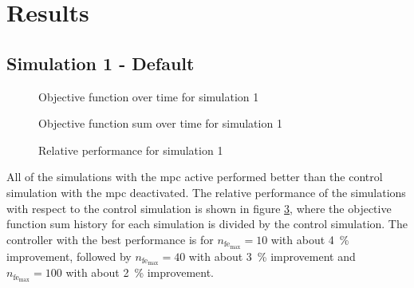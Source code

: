 \documentclass[conference]{IEEEtran}
\begin{document}
\section{Results} \label{sec:results} 

\subsection{Simulation 1 - Default}  \label{subsec:results_SS01}

\begin{figure}[h]
    \centering
    
    \caption{Objective function over time for simulation 1}
    \label{fig:SS01_obj_hist}
\end{figure}

%     

\begin{figure}[h]
    \centering
    
    \caption{Objective function sum over time for simulation 1}
    \label{fig:SS01_s_obj_hist}
\end{figure}

\begin{figure}[h]
    \centering
    
    \caption{Relative performance for simulation 1}
    \label{fig:SS01_s_obj_rel}
\end{figure}


All of the simulations with the \gls{mpc} active performed better than the control simulation with the \gls{mpc} deactivated.
The relative performance of the simulations with respect to the control simulation is shown in figure \ref{fig:SS01_s_obj_rel}, where the objective function sum history for each simulation is divided by the control simulation.
The controller with the best performance is for $n_{\text{fe}_{\text{max}}} = 10$ with about \SI{4}{\percent} improvement, followed by $n_{\text{fe}_{\text{max}}} = 40$ with about \SI{3}{\percent} improvement and $n_{\text{fe}_{\text{max}}} = 100$ with about \SI{2}{\percent} improvement.
\end{document}
